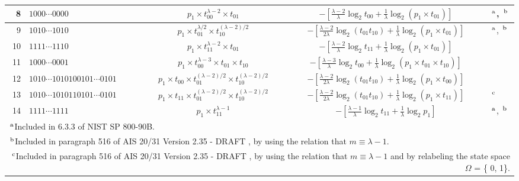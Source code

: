 ﻿\documentclass[a4paper,xelatex,english]{bxjsarticle}
\begin{document}
\begin{table}[htbp]
\begin{center}
\begin{tabular}{|r|l|c|c|l|}
\hline 
8 & $1000 \cdots 0000$ & $p_{1} \times t_{00}^{\lambda - 2} \times t_{01}$ & $-\left[ \frac{\lambda - 2}{\lambda} \log_{2} t_{00}+ \frac{1}{\lambda} \log_{2} \left( p_{1} \times t_{01} \right)\right]$ & $^{\textrm{\,a}}$, $^{\textrm{\,b}}$ \\
\hline 
9 & $1010 \cdots 1010$ & $p_{1} \times t_{01}^{\lambda / 2} \times t_{10}^{(\lambda - 2) / 2}$ & $-\left[ \frac{\lambda - 2}{2\lambda} \log_{2} \left( t_{01} t_{10} \right) + \frac{1}{\lambda} \log_{2} \left( p_{1} \times t_{01} \right) \right]$ & $^{\textrm{\,a}}$, $^{\textrm{\,b}}$ \\
\hline 
10 & $1111 \cdots 1110$ & $p_{1} \times t_{11}^{\lambda - 2} \times t_{01}$ & $-\left[ \frac{\lambda - 2}{\lambda} \log_{2} t_{11}+ \frac{1}{\lambda} \log_{2} \left( p_{1} \times t_{01} \right)\right]$ &  \\
\hline 
11 & $1000 \cdots 0001$ & $p_{1} \times t_{00}^{\lambda - 3} \times t_{01} \times t_{10}$ & $-\left[ \frac{\lambda - 3}{\lambda} \log_{2} t_{00} + \frac{1}{\lambda} \log_{2} \left( p_{1} \times t_{01} \times t_{10} \right) \right]$ &  \\
\hline
12 & $1010 \cdots 1010100101 \cdots 0101$ & $p_{1} \times t_{00} \times t_{01}^{(\lambda - 2) / 2} \times t_{10}^{(\lambda - 2) / 2}$ & $-\left[ \frac{\lambda - 2}{2\lambda} \log_{2} \left( t_{01} t_{10} \right) + \frac{1}{\lambda} \log_{2} \left( p_{1} \times t_{00} \right) \right]$ &  \\
\hline
13 & $1010 \cdots 1010110101 \cdots 0101$ & $p_{1} \times t_{11} \times t_{01}^{(\lambda - 2) / 2} \times t_{10}^{(\lambda - 2) / 2}$ & $-\left[ \frac{\lambda - 2}{2\lambda} \log_{2} \left( t_{01} t_{10} \right) + \frac{1}{\lambda} \log_{2} \left( p_{1} \times t_{11} \right) \right]$ & \qquad $^{\textrm{\,c}}$ \\
\hline 
14 & $1111 \cdots 1111$ & $p_{1} \times t_{11}^{\lambda - 1}$ & $-\left[ \frac{\lambda - 1}{\lambda} \log_{2} t_{11} + \frac{1}{\lambda} \log_{2} p_{1} \right]$ & $^{\textrm{\,a}}$, $^{\textrm{\,b}}$ \\
\hline 
\hline 
\multicolumn{5}{|l|}{$^{\textrm{\,a}}$\quad Included in 6.3.3 of NIST SP 800-90B\cite{SP80090B}.} \\ 
\multicolumn{5}{|l|}{$^{\textrm{\,b}}$\quad Included in paragraph 516 of AIS 20/31 Version 2.35 - DRAFT \cite{AIS31draft2022}, by using the relation that $m \equiv \lambda - 1$.} \\ 
\multicolumn{5}{|p{17cm}|}{$^{\textrm{\,c}}$\quad Included in paragraph 516 of AIS 20/31 Version 2.35 - DRAFT \cite{AIS31draft2022}, by using the relation that $m \equiv \lambda - 1$ and by relabeling the state space $\Omega$ = \{ 0, 1\}.} \\ 
\hline 
\end{tabular}

\end{center}
\end{table}
\end{document}
